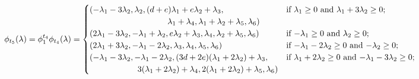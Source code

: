 \documentclass{amsart}
\numberwithin{theorem}{section}
\begin{document}
  \[
    \phi_{t_5}(\lambda)=\phi^{t_4}_1\phi_{t_4}(\lambda)
    =
    \begin{cases}
      (-\lambda_1-3\lambda_2,\lambda_2,(d+e)\lambda_1+e\lambda_2+\lambda_3, & \text{if $\lambda_1 \ge 0$ and $\lambda_1+3\lambda_2 \ge 0$;}\\
      \hspace{1.3in} \lambda_1+\lambda_4,\lambda_1+\lambda_2+\lambda_5,\lambda_6) & \\
      (2\lambda_1-3\lambda_2,-\lambda_1+\lambda_2,e\lambda_2+\lambda_3,\lambda_4,\lambda_2+\lambda_5,\lambda_6) & \text{if $-\lambda_1 \ge 0$ and $\lambda_2 \ge 0$;}\\
      (2\lambda_1+3\lambda_2,-\lambda_1-2\lambda_2,\lambda_3,\lambda_4,\lambda_5,\lambda_6) & \text{if $-\lambda_1-2\lambda_2 \ge 0$ and $-\lambda_2 \ge 0$;}\\
      (-\lambda_1-3\lambda_2,-\lambda_1-2\lambda_2,(3d+2e)(\lambda_1+2\lambda_2)+\lambda_3, & \text{if $\lambda_1+2\lambda_2 \ge 0$ and $-\lambda_1-3\lambda_2 \ge 0$;}\\
      \hspace{0.8in} 3(\lambda_1+2\lambda_2)+\lambda_4,2(\lambda_1+2\lambda_2)+\lambda_5,\lambda_6) & \\
    \end{cases}
  \]
\end{document}

